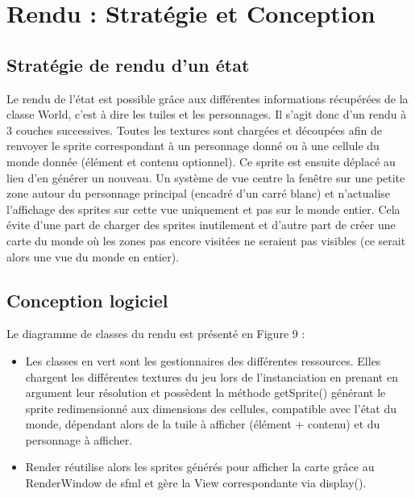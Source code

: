 \documentclass[a4paper,12pt]{article}
\begin{document}
\clearpage
\section{Rendu : Stratégie et Conception}

\subsection{Stratégie de rendu d’un état}
Le rendu de l'état est possible grâce aux différentes informations récupérées de la classe World, c'est à dire les tuiles et les personnages. Il s'agit donc d'un rendu à 3 couches successives. Toutes les textures sont chargées et découpées afin de renvoyer le sprite correspondant à un personnage donné ou à une cellule du monde donnée (élément et contenu optionnel). Ce sprite est ensuite déplacé au lieu d'en générer un nouveau. Un système de vue centre la fenêtre sur une petite zone autour du personnage principal (encadré d'un carré blanc) et n'actualise l'affichage des sprites sur cette vue uniquement et pas sur le monde entier. Cela évite d'une part de charger des sprites inutilement et d'autre part de créer une carte du monde où les zones pas encore visitées ne seraient pas visibles (ce serait alors une vue du monde en entier).


\subsection{Conception logiciel}

 Le diagramme de classes du rendu est présenté en Figure 9 : 
\begin{itemize}
\item Les classes en vert sont les gestionnaires des différentes ressources. Elles chargent les différentes textures du jeu lors de l'instanciation en prenant en argument leur résolution et possèdent la méthode getSprite() générant le sprite redimensionné aux dimensions des cellules, compatible avec l'état du monde, dépendant alors de la tuile à afficher (élément + contenu) et du personnage à afficher.
\item Render réutilise alors les sprites générés pour afficher la carte grâce au RenderWindow de sfml et gère la View correspondante via display().
\end{itemize}
\end{document}
